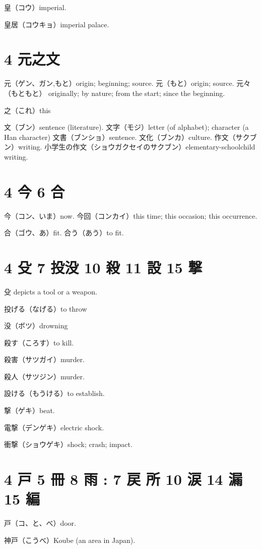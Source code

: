皇（コウ）imperial.

皇居（コウキョ）imperial palace.

\section{4 元之文}

元（ゲン、ガン,もと）origin; beginning; source.
元（もと）origin; source.
元々（もともと）
originally; by nature; from the start; since the beginning.

之（これ）this

文（ブン）sentence (literature).
文字（モジ）letter (of alphabet); character (a Han character)
文書（ブンショ）sentence.
文化（ブンカ）culture.
作文（サクブン）writing.
小学生の作文（ショウガクセイのサクブン）elementary-schoolchild writing.

\section{4 今 6 合}

今（コン、いま）now.
今回（コンカイ）this time; this occasion; this occurrence.

合（ゴウ、あ）fit.
合う（あう）to fit.

\section{4 殳 7 投没 10 殺 11 設 15 撃}

殳 depicts a tool or a weapon.

投げる（なげる）to throw

没（ボツ）drowning

殺す（ころす）to kill.

殺害（サツガイ）murder.

殺人（サツジン）murder.

設ける（もうける）to establish.

撃（ゲキ）beat.

電撃（デンゲキ）electric shock.

衝撃（ショウゲキ）shock; crash; impact.

\section{4 戸 5 冊 8 雨 : 7 戻 所 10 涙 14 漏 15 編}

戸（コ、と、べ）door.

神戸（こうべ）Koube (an area in Japan).

